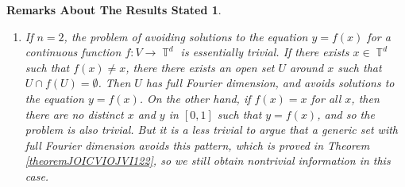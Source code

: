 \documentclass[dvipsnames,letterpaper,12pt]{article}
\numberwithin{equation}{section}
\DeclareMathOperator{\fordim}{\dim_{\mathbb{F}}}
\DeclareMathOperator{\TT}{\mathbb{T}}
\newtheorem*{remarksaboutresults}{Remarks About The Results Stated}
\numberwithin{theorem}{section}
\begin{document}
\begin{remarksaboutresults}
\begin{enumerate}


        \item If $n = 2$, the problem of avoiding solutions to the equation $y = f(x)$ for a continuous function $f: V \to \TT^d$ is essentially trivial. If there exists $x \in \TT^d$ such that $f(x) \neq x$, there there exists an open set $U$ around $x$ such that $U \cap f(U) = \emptyset$. Then $U$ has full Fourier dimension, and avoids solutions to the equation $y = f(x)$. On the other hand, if $f(x) = x$ for all $x$, then there are no distinct $x$ and $y$ in $[0,1]$ such that $y = f(x)$, and so the problem is also trivial. But it is a less trivial to argue that a \emph{generic} set with full Fourier dimension avoids this pattern, which is proved in Theorem \ref{theoremJOICVIOJVI122}, so we still obtain nontrivial information in this case.


\end{enumerate}
\end{remarksaboutresults}
\end{document}
